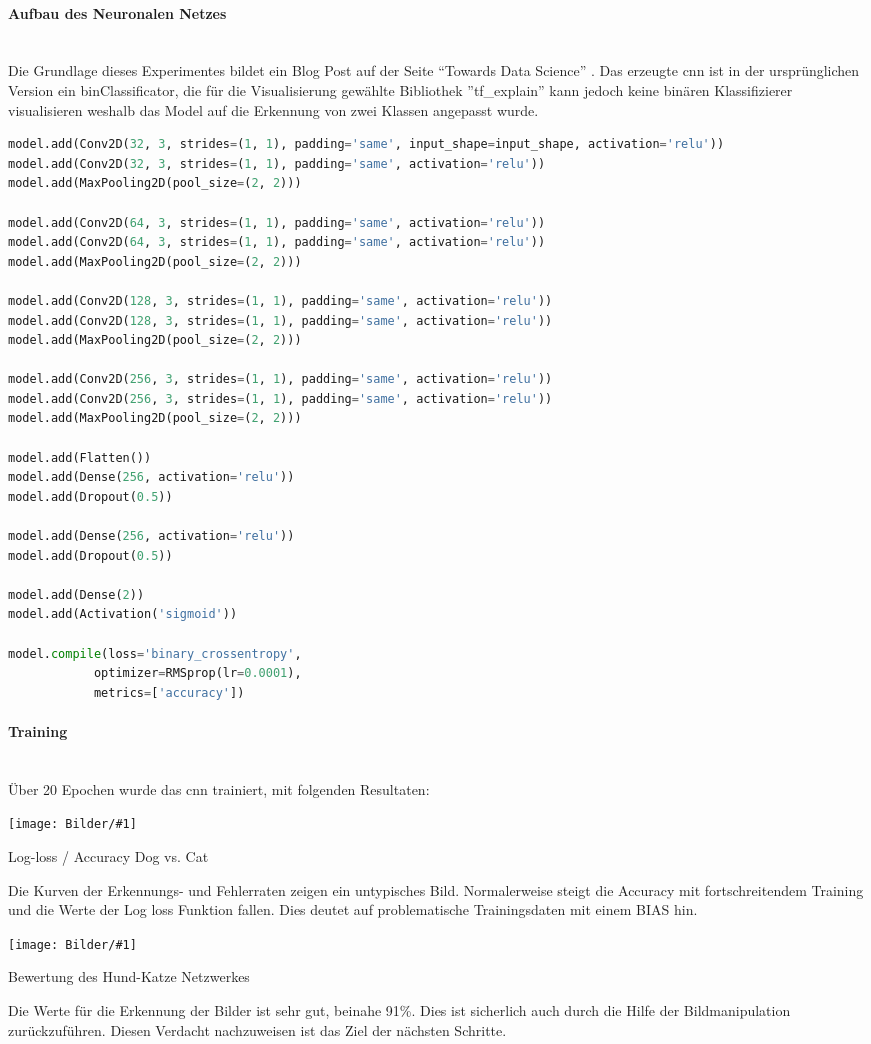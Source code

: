 \documentclass[
  12pt, %
  a4paper, %
  oneside, %
  openany, 
  numbers=noenddot, %
  BCOR=5mm, %
  parskip=half*, %
  thesis, %
]{bfhbook}
\newcommand{\parag}[1]{\paragraph*{#1}\mbox{}\\}
\newcommand{\imgText}[3]{
\begin{center}
    \begin{minipage}[t]{0.6\textwidth}
    		\vspace{0pt}
		\texttt{[image: Bilder/\#1]}
		\caption{#2}
	\end{minipage}\hfill
    \begin{minipage}[t]{0.4\textwidth}
    		\vspace{5pt}
  		#3
    \end{minipage}
\end{center}
}
\begin{document}
\parag{Aufbau des Neuronalen Netzes}
Die Grundlage dieses Experimentes bildet ein Blog Post auf der Seite ``Towards Data Science''  \cite{dogVsCats}. Das erzeugte \acrshort{cnn} ist in der ursprünglichen Version ein \Gls{binClassificator}, die für die Visualisierung gewählte Bibliothek ''tf\_explain'' \cite{tfExplain} kann jedoch keine binären Klassifizierer visualisieren weshalb das Model auf die Erkennung von zwei Klassen angepasst wurde.

\begin{lstlisting}[language=Python, caption=CNN für Dog vs. Cats]
model.add(Conv2D(32, 3, strides=(1, 1), padding='same', input_shape=input_shape, activation='relu'))
model.add(Conv2D(32, 3, strides=(1, 1), padding='same', activation='relu'))
model.add(MaxPooling2D(pool_size=(2, 2)))

model.add(Conv2D(64, 3, strides=(1, 1), padding='same', activation='relu'))
model.add(Conv2D(64, 3, strides=(1, 1), padding='same', activation='relu'))
model.add(MaxPooling2D(pool_size=(2, 2)))

model.add(Conv2D(128, 3, strides=(1, 1), padding='same', activation='relu'))
model.add(Conv2D(128, 3, strides=(1, 1), padding='same', activation='relu'))
model.add(MaxPooling2D(pool_size=(2, 2)))

model.add(Conv2D(256, 3, strides=(1, 1), padding='same', activation='relu'))
model.add(Conv2D(256, 3, strides=(1, 1), padding='same', activation='relu'))
model.add(MaxPooling2D(pool_size=(2, 2)))

model.add(Flatten())
model.add(Dense(256, activation='relu'))
model.add(Dropout(0.5))

model.add(Dense(256, activation='relu'))
model.add(Dropout(0.5))

model.add(Dense(2))
model.add(Activation('sigmoid'))
    
model.compile(loss='binary_crossentropy',
            optimizer=RMSprop(lr=0.0001),
            metrics=['accuracy'])
\end{lstlisting}

\parag{Training}
Über 20 Epochen wurde das \acrshort{cnn} trainiert, mit folgenden Resultaten:
\imgText{Training-Manipulated-LogLoss.png}{Log-loss / Accuracy Dog vs. Cat}{
Die Kurven der Erkennungs- und Fehlerraten zeigen ein untypisches Bild. Normalerweise steigt die Accuracy mit fortschreitendem Training und die Werte der Log loss Funktion fallen. Dies deutet auf problematische Trainingsdaten mit einem \Gls{BIAS} hin.
}

\imgText{Training-Manipulated-StatisticsTable.png}{Bewertung des Hund-Katze Netzwerkes}{
Die Werte für die Erkennung der Bilder ist sehr gut, beinahe 91\%. Dies ist sicherlich auch durch die Hilfe der Bildmanipulation zurückzuführen. Diesen Verdacht nachzuweisen ist das Ziel der nächsten Schritte.
}
\end{document}
